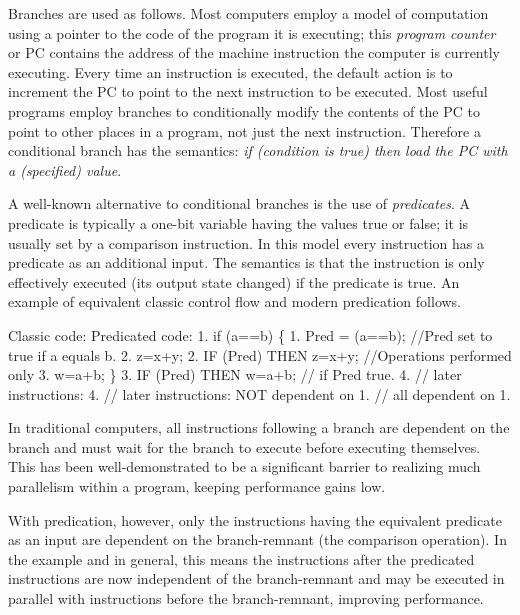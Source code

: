 \documentclass[10pt,dvips]{article}
\begin{document}
Branches are used as follows.
Most computers employ a model of computation using a pointer to the code of
the program it is executing; this {\it program counter} or PC contains
the address of the machine instruction the computer is currently executing. Every time
an instruction is executed, the default action is to increment the PC to point
to the next instruction to be executed. Most useful programs employ branches to
conditionally modify the contents of the PC to point to other places in a program, not
just the next instruction. Therefore a conditional
branch has the semantics: {\it if (condition
is true) then load the PC with a (specified) value}.

A well-known alternative to conditional branches is the use of {\it predicates}.
A predicate is typically a one-bit variable having the values true or false; it
is usually set by a comparison instruction. In this model every instruction has
a predicate as an additional input. The semantics is that the instruction is
only effectively executed (its output state changed)
if the predicate is true. An example of equivalent
classic control flow and modern predication follows.

\vspace{0.1in}
\begin{center}
\begin{minipage}{6.1in}
\begin{spacing}{1}
\begin{verbatimcmd}
       {\rm Classic code:}               {\rm Predicated code:}
1.  if (a==b) \{                1. Pred = (a==b);  //Pred set to true if a equals b.
2.      z=x+y;                 2. IF (Pred) THEN z=x+y; //Operations performed only
3.      w=a+b; \}               3. IF (Pred) THEN w=a+b; //    if Pred true.
4.  // later instructions:     4. // later instructions: NOT dependent on 1.
    //   all dependent on 1.
\end{verbatimcmd}
\end{spacing}
\end{minipage}
\end{center}
\vspace{-0.25in}

In traditional computers, all instructions following a branch are
dependent on the branch and must wait for the branch to execute before
executing themselves. This has been well-demonstrated to be a significant
barrier to realizing much parallelism within a program, keeping performance
gains low.

With predication, however, only the instructions having the equivalent
predicate as an input are dependent on the branch-remnant (the comparison
operation). In the example and in
general, this means the instructions after the predicated instructions are now
independent of the branch-remnant and may be executed in parallel with instructions
before the branch-remnant, improving performance.
\end{document}
